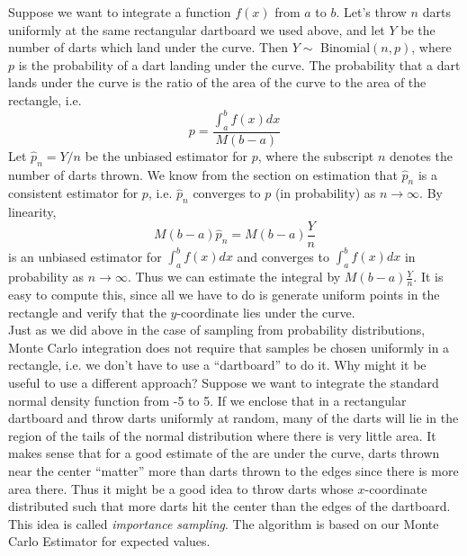 \documentclass[notes.tex]{subfiles}
\begin{document}
Suppose we want to integrate a function $f(x)$ from $a$ to $b$. Let's throw $n$ darts uniformly at the same rectangular dartboard we used above, and let $Y$ be the number of darts which land under the curve. Then $Y \sim$ Binomial$(n, p)$, where $p$ is the probability of a dart landing under the curve. The probability that a dart lands under the curve is the ratio of the area of the curve to the area of the rectangle, i.e.
\[
p = \dfrac{\int_a^b f(x) dx}{M(b-a)}
\]
Let $\hat{p}_n = Y/n$ be the unbiased estimator for $p$, where the subscript $n$ denotes the number of darts thrown. We know from the section on estimation that $\hat{p}_n$ is a consistent estimator for $p$, i.e. $\hat{p}_n$ converges to $p$ (in probability) as $n \rightarrow \infty$. By linearity,
\[
M(b-a) \hat{p}_n = M(b-a)\frac{Y}{n}
\] 
is an unbiased estimator for $\int_a^b f(x) dx$ and converges to $\int_a^b f(x) dx$ in probability as $n \rightarrow \infty$. Thus we can estimate the integral by $M(b-a)\frac{Y}{n}$. It is easy to compute this, since all we have to do is generate uniform points in the rectangle and verify that the $y$-coordinate lies under the curve.\\

Just as we did above in the case of sampling from probability distributions, Monte Carlo integration does not require that samples be chosen uniformly in a rectangle, i.e. we don't have to use a ``dartboard'' to do it. Why might it be useful to use a different approach? Suppose we want to integrate the standard normal density function from -5 to 5. If we enclose that in a rectangular dartboard and throw darts uniformly at random, many of the darts will lie in the region of the tails of the normal distribution where there is very little area. It makes sense that for a good estimate of the are under the curve, darts thrown near the center ``matter'' more than darts thrown to the edges since there is more area there. Thus it might be a good idea to throw darts whose $x$-coordinate distributed such that more darts hit the center than the edges of the dartboard. This idea is called \emph{importance sampling}. The algorithm is based on our Monte Carlo Estimator for expected values.\\
\end{document}
